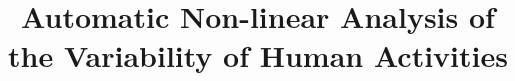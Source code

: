 \documentclass[10pt,journal,compsoc]{IEEEtran}
\begin{document}
%
\title{Automatic Non-linear Analysis of the Variability of Human Activities}

%
%
%
%
\end{document}
